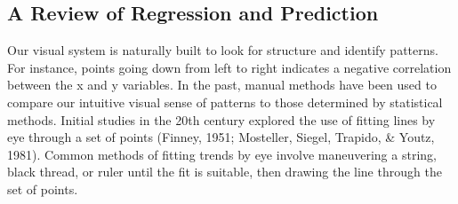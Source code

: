 \documentclass[print]{nuthesis}
\begin{document}
\hypertarget{a-review-of-regression-and-prediction}{%
\subsection{A Review of Regression and Prediction}\label{a-review-of-regression-and-prediction}}

Our visual system is naturally built to look for structure and identify patterns.
For instance, points going down from left to right indicates a negative correlation between the x and y variables.
In the past, manual methods have been used to compare our intuitive visual sense of patterns to those determined by statistical methods.
Initial studies in the 20th century explored the use of fitting lines by eye through a set of points (Finney, 1951; Mosteller, Siegel, Trapido, \& Youtz, 1981).
Common methods of fitting trends by eye involve maneuvering a string, black thread, or ruler until the fit is suitable, then drawing the line through the set of points.
\end{document}
